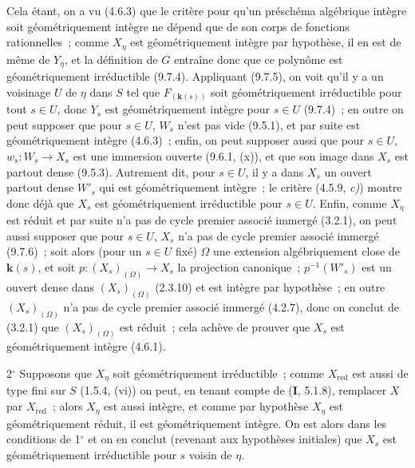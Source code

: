 Cela étant, on a vu (4.6.3) que le critère pour qu'un préschéma algébrique
intègre soit géométriquement intègre ne dépend que de son corps de fonctions
rationnelles~; comme $X_\eta$ est géométriquement intègre par hypothèse, il en
est de même de $Y_\eta$, et la définition de $G$ entraîne donc que ce polynôme
est géométriquement irréductible (9.7.4). Appliquant (9.7.5), on voit qu'il y a
un voisinage $U$ de $\eta$ dans $S$ tel que $F_{(\mathbf{k}(s))}$ soit
géométriquement irréductible pour tout $s\in U$, donc $Y_s$ est géométriquement
intègre pour $s\in U$ (9.7.4)~; en outre on peut supposer que pour $s\in U$,
$W_s$ n'est pas vide (9.5.1), et par suite est géométriquement intègre (4.6.3)~;
enfin, on peut supposer aussi que
pour $s\in U$, $w_s:W_s\to X_s$ est une immersion ouverte (9.6.1, (x)), et que
son image dans $X_s$ est partout dense (9.5.3). Autrement dit, pour $s\in U$,
il y a dans $X_s$ un ouvert partout dense $W'_s$ qui est géométriquement
intègre~; le critère (4.5.9, \emph{c)}) montre donc déjà que $X_s$ est
géométriquement irréductible pour $s\in U$. Enfin, comme $X_\eta$ est réduit et
par suite n'a pas de cycle premier associé immergé (3.2.1), on peut aussi
supposer que pour $s\in U$, $X_s$ n'a pas de cycle premier associé immergé
(9.7.6)~; soit alors (pour un $s\in U$ fixé) $\Omega$ une extension
algébriquement close de $\boldsymbol{k}(s)$, et soit
$p:(X_s)_{(\Omega)}\to X_s$ la projection canonique~; $p^{-1}(W'_s)$ est un
ouvert dense dans $(X_s)_{(\Omega)}$ (2.3.10) et est intègre par hypothèse~; en
outre $(X_s)_{(\Omega)}$ n'a pas de cycle premier associé immergé (4.2.7), donc
on conclut de (3.2.1) que $(X_s)_{(\Omega)}$ est réduit~; cela achève de prouver
que $X_s$ est géométriquement intègre (4.6.1).

2$^\circ$ Supposons que $X_\eta$ soit géométriquement irréductible~; comme
$X_{\mathrm{red}}$ est aussi de type fini sur $S$ (1.5.4, (vi)) on peut, en
tenant compte de (\textbf{I}, 5.1.8), remplacer $X$ par $X_{\mathrm{red}}$~;
alors $X_\eta$ est aussi intègre, et comme par hypothèse $X_\eta$ est
géométriquement réduit, il est géométriquement intègre. On est alors dans les
conditions de 1$^\circ$ et on en conclut (revenant aux hypothèses initiales) que
$X_s$ est géométriquement irréductible pour $s$ voisin de $\eta$.

